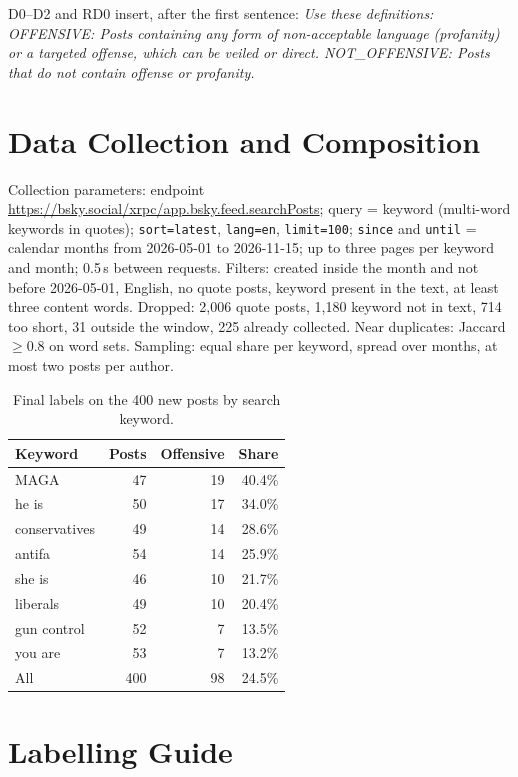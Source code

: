 \documentclass[11pt]{article}
\begin{document}
D0--D2 and RD0 insert, after the first sentence: \emph{Use these definitions: OFFENSIVE: Posts containing any form of non-acceptable language (profanity) or a targeted offense, which can be veiled or direct. NOT\_OFFENSIVE: Posts that do not contain offense or profanity.}

\section{Data Collection and Composition}
\label{app:data}

Collection parameters: endpoint \url{https://bsky.social/xrpc/app.bsky.feed.searchPosts}; query = keyword (multi-word keywords in quotes); \texttt{sort=latest}, \texttt{lang=en}, \texttt{limit=100}; \texttt{since} and \texttt{until} = calendar months from 2026-05-01 to 2026-11-15; up to three pages per keyword and month; 0.5\,s between requests. Filters: created inside the month and not before 2026-05-01, English, no quote posts, keyword present in the text, at least three content words. Dropped: 2,006 quote posts, 1,180 keyword not in text, 714 too short, 31 outside the window, 225 already collected. Near duplicates: Jaccard $\geq 0.8$ on word sets. Sampling: equal share per keyword, spread over months, at most two posts per author.

\begin{table}[h]
  \centering\small
  \begin{tabular}{lrrr}
    \toprule
    Keyword & Posts & Offensive & Share \\
    \midrule
    MAGA & 47 & 19 & 40.4\% \\
    he is & 50 & 17 & 34.0\% \\
    conservatives & 49 & 14 & 28.6\% \\
    antifa & 54 & 14 & 25.9\% \\
    she is & 46 & 10 & 21.7\% \\
    liberals & 49 & 10 & 20.4\% \\
    gun control & 52 & 7 & 13.5\% \\
    you are & 53 & 7 & 13.2\% \\
    \midrule
    All & 400 & 98 & 24.5\% \\
    \bottomrule
  \end{tabular}
  \caption{Final labels on the 400 new posts by search keyword.}
  \label{tab:kw}
\end{table}

\section{Labelling Guide}
\label{app:guide}
\end{document}
